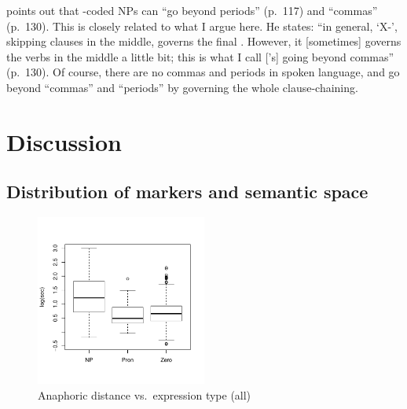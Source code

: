  points out that
-coded NPs can ``go beyond periods'' (p.~117) and ``commas'' (p.~130).
This is closely related to what I argue here.
%
%
He states:
``in general, `X-', skipping  clauses in the middle, governs the final .
However, it [sometimes] governs the verbs in the middle a little bit;
this is what I call ['s] going beyond commas'' (p.~130).
Of course, there are no commas and periods in spoken language,
 and  go beyond ``commas'' and ``periods'' by governing the whole clause-chaining.

\section{Discussion}\label{ParticlesDiscussion}

\subsection{Distribution of markers and semantic space}

\begin{figure}
	\begin{center}
	\includegraphics[width=0.5\textwidth]{figure/DistExpType.pdf}
	\caption{Anaphoric distance vs.\ expression type (all)}
	\label{DistExpTypeF2}
	\end{center}
\end{figure}


